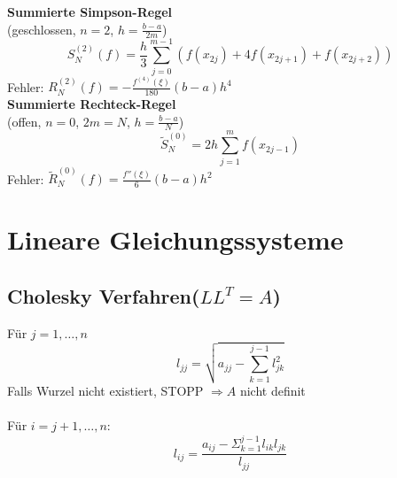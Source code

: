 \documentclass[
ngerman,
accentcolor=9c,%
type=intern,
marginpar=false
]{tudapub}
\begin{document}
            \textbf{Summierte Simpson-Regel}\\
            (geschlossen, $n = 2$, $h=\frac{b-a}{2m}$)
            \begin{equation*}
                S^{(2)}_N(f)=\dfrac{h}{3}\sum^{m-1}_{j=0}(f(x_{2j}) + 4f(x_{2j+1}) + f(x_{2j+2}))
            \end{equation*}
            Fehler: $R^{(2)}_N(f)=-\frac{f^{(4)}(\xi)}{180}(b-a)h^4$\\[2ex]

            \textbf{Summierte Rechteck-Regel}\\
            (offen, $n=0$, $2m = N$, $h = \frac{b-a}{N}$)
            \begin{equation*}
                \tilde{S}_N^{(0)} = 2h \sum^m_{j=1} f(x_{2j-1})
            \end{equation*}
            Fehler: $\tilde{R}^{(0)}_N(f)= \frac{f''(\xi)}{6}(b-a)h^2$

    \newpage

    \section{Lineare Gleichungssysteme}
        \subsection{Cholesky Verfahren\hspace{1em}($LL^T = A$)}
            Für $j= 1,\dots ,n$
            \begin{equation*}
                l_{jj} =\sqrt{a_{jj}-\sum^{j-1}_{k=1}l_{jk}^2}
            \end{equation*}
            Falls Wurzel nicht existiert, STOPP $\Rightarrow A$ nicht definit\\
            \\
            \hspace{20mm} Für $i=j+1,\dots,n:$
            \begin{equation*}
                l_{ij} = \dfrac{a_{ij}-\Sigma_{k=1}^{j-1}l_{ik}l_{jk}}{l_{jj}}
            \end{equation*}
\end{document}
